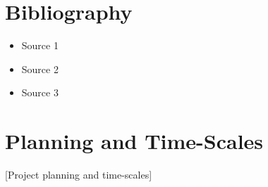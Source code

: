\documentclass[a4paper,12pt]{article}
\begin{document}
\section{Bibliography}
\begin{itemize}
  \item Source 1
  \item Source 2
  \item Source 3
\end{itemize}

\section{Planning and Time-Scales}
[Project planning and time-scales]
\end{document}
